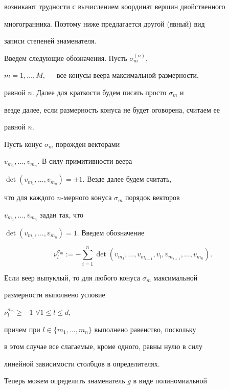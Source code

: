 возникают трудности с вычислением координат вершин двойственного


многогранника. Поэтому ниже предлагается другой (явный) вид


записи степеней знаменателя.





Введем следующие обозначения. Пусть $\sigma_m^{(n)}$,


$m=1,\dotsc,M$, --- все конусы веера максимальной размерности,


равной $n$. Далее для краткости будем писать просто $\sigma_m$ и


везде далее, если размерность конуса не будет оговорена, считаем ее


равной $n$.





Пусть конус $\sigma_m$ порожден векторами


$v_{m_1},...,v_{m_n}$. В силу примитивности веера 


$\det(v_{m_1},...,v_{m_n})=\pm 1$. Везде далее будем считать,


что для каждого $n$-мерного конуса  $\sigma_m$ порядок векторов


$v_{m_1},\dotsc,v_{m_n}$ задан так, что


$\det(v_{m_1},\dotsc,v_{m_n})=1$. Введем обозначение


\begin{equation*}


\nu_l^{\sigma_m}:=-\sum_{i=1}^{n}


\det(v_{m_1},\dotsc,v_{m_{i-1}},v_l,v_{m_{i+1}},\dotsc,v_{m_n}).




\end{equation*}


Если веер выпуклый, то для любого конуса $\sigma_m$ максимальной


размерности выполнено условие


$\nu_l^{\sigma_m}\geqslant -1$ $\forall 1\leqslant l\leqslant d$,


причем при $l\in\{m_1,\dotsc,m_n\}$ выполнено равенство, поскольку


в этом случае все слагаемые, кроме одного, равны нулю в силу


линейной зависимости столбцов в определителях.





Теперь можем определить знаменатель $g$ в виде полиномиальной


